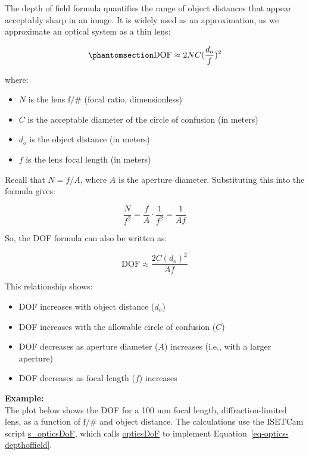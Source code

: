\documentclass[
  letterpaper,
]{book}
\providecommand{\tightlist}{%
  \setlength{\itemsep}{0pt}\setlength{\parskip}{0pt}}\usepackage{longtable,booktabs,array}
\begin{document}
The depth of field formula quantifies the range of object distances that
appear acceptably sharp in an image. It is widely used as an
approximation, as we approximate an optical system as a thin lens:

\begin{equation}\phantomsection\label{eq-optics-depthoffield}{
\text{DOF} \approx 2 N C ({\frac{d_o}{f}})^2
}\end{equation}

where:

\begin{itemize}
\tightlist
\item
  \(N\) is the lens \(\mathrm{f}/\#\) (focal ratio, dimensionless)
\item
  \(C\) is the acceptable diameter of the circle of confusion (in
  meters)
\item
  \(d_o\) is the object distance (in meters)
\item
  \(f\) is the lens focal length (in meters)
\end{itemize}

Recall that \(N = f/A\), where \(A\) is the aperture diameter.
Substituting this into the formula gives:

\[
\frac{N}{f^2} = \frac{f}{A} \cdot \frac{1}{f^2} = \frac{1}{A f}
\]

So, the DOF formula can also be written as:

\[
\text{DOF} \approx \frac{2 C (d_o)^2}{A f}
\]

This relationship shows:

\begin{itemize}
\tightlist
\item
  DOF increases with object distance (\(d_o\))
\item
  DOF increases with the allowable circle of confusion (\(C\))
\item
  DOF decreases as aperture diameter (\(A\)) increases (i.e., with a
  larger aperture)
\item
  DOF decreases as focal length (\(f\)) increases
\end{itemize}

\textbf{Example:}\\
The plot below shows the DOF for a 100 mm focal length,
diffraction-limited lens, as a function of \(\mathrm{f}/\#\) and object
distance. The calculations use the ISETCam script
\href{https://github.com/iset/ISETCam/blob/main/scripts/optics/focus_dof/s_opticsDoF.m}{s\_opticsDoF},
which calls
\href{https://github.com/iset/ISETCam/blob/main/opticalimage/optics/opticsDoF.m}{opticsDoF}
to implement Equation~\ref{eq-optics-depthoffield}.
\end{document}
